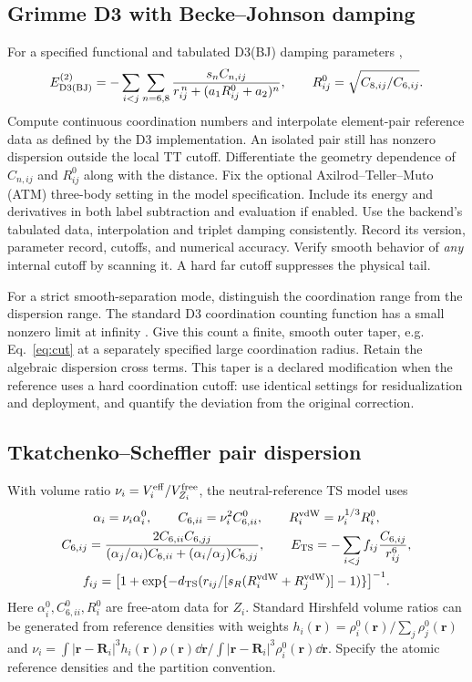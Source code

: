 \documentclass[11pt,a4paper]{article}
\begin{document}
\subsection{Grimme D3 with Becke--Johnson damping}
For a specified functional and tabulated D3(BJ) damping parameters \cite{d3,d3bj},
\begin{equation}
 E_{\rm D3(BJ)}^{(2)}=-\sum_{i<j}\sum_{n=6,8}
 \frac{s_n C_{n,ij}}{r_{ij}^{\,n}+(a_1R^0_{ij}+a_2)^n},\qquad
 R^0_{ij}=\sqrt{C_{8,ij}/C_{6,ij}}. \label{eq:d3}
\end{equation}
Compute continuous coordination numbers and interpolate element-pair reference data as defined by the D3 implementation. An isolated pair still has nonzero dispersion outside the local TT cutoff. Differentiate the geometry dependence of $C_{n,ij}$ and $R^0_{ij}$ along with the distance. Fix the optional Axilrod--Teller--Muto (ATM) three-body setting in the model specification. Include its energy and derivatives in both label subtraction and evaluation if enabled. Use the backend's tabulated data, interpolation and triplet damping consistently. Record its version, parameter record, cutoffs, and numerical accuracy. Verify smooth behavior of \emph{any} internal cutoff by scanning it. A hard far cutoff suppresses the physical tail.

For a strict smooth-separation mode, distinguish the coordination range from the dispersion range. The standard D3 coordination counting function has a small nonzero limit at infinity \cite{cncut}. Give this count a finite, smooth outer taper, e.g. Eq.~\eqref{eq:cut} at a separately specified large coordination radius. Retain the algebraic dispersion cross terms. This taper is a declared modification when the reference uses a hard coordination cutoff: use identical settings for residualization and deployment, and quantify the deviation from the original correction.

\subsection{Tkatchenko--Scheffler pair dispersion}
With volume ratio $\nu_i=V_i^{\rm eff}/V_{Z_i}^{\rm free}$, the neutral-reference TS model uses \cite{ts}
\begin{gather}
 \alpha_i=\nu_i\alpha_i^0,\qquad C_{6,ii}=\nu_i^2C_{6,ii}^0,\qquad
 R_i^{\rm vdW}=\nu_i^{1/3}R_i^0,\nonumber\\
 C_{6,ij}=\frac{2C_{6,ii}C_{6,jj}}
 {(\alpha_j/\alpha_i)C_{6,ii}+(\alpha_i/\alpha_j)C_{6,jj}},\qquad
 E_{\rm TS}=-\sum_{i<j}f_{ij}\frac{C_{6,ij}}{r_{ij}^6},\nonumber\\
 f_{ij}=\big[1+\exp\{-d_{\rm TS}(r_{ij}/[s_R(R_i^{\rm vdW}+R_j^{\rm vdW})]-1)\}\big]^{-1}.
 \label{eq:ts}
\end{gather}
Here $\alpha_i^0,C_{6,ii}^0,R_i^0$ are free-atom data for $Z_i$. Standard Hirshfeld volume ratios can be generated from reference densities with weights $h_i(\mathbf r)=\rho_i^0(\mathbf r)/\sum_j\rho_j^0(\mathbf r)$ and $\nu_i=\int |\mathbf r-\mathbf R_i|^3 h_i(\mathbf r)\rho(\mathbf r)\dd\mathbf r\big/\int |\mathbf r-\mathbf R_i|^3\rho_i^0(\mathbf r)\dd\mathbf r$. Specify the atomic reference densities and the partition convention.
\end{document}
